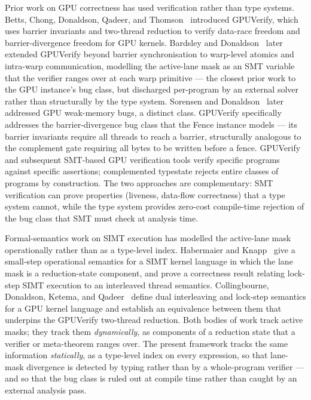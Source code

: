 \documentclass[acmsmall,screen,review,anonymous,nonacm]{acmart}
\begin{document}
Prior work on GPU correctness has used verification rather than type systems. Betts, Chong, Donaldson, Qadeer, and Thomson~\cite{betts:oopsla:2012} introduced GPUVerify, which uses barrier invariants and two-thread reduction to verify data-race freedom and barrier-divergence freedom for GPU kernels. Bardsley and Donaldson~\cite{bardsley:nfm:2014} later extended GPUVerify beyond barrier synchronisation to warp-level atomics and intra-warp communication, modelling the active-lane mask as an SMT variable that the verifier ranges over at each warp primitive --- the closest prior work to the GPU instance's bug class, but discharged per-program by an external solver rather than structurally by the type system. Sorensen and Donaldson~\cite{sorensen:pldi:2016} later addressed GPU weak-memory bugs, a distinct class. GPUVerify specifically addresses the barrier-divergence bug class that the Fence instance models --- its barrier invariants require all threads to reach a barrier, structurally analogous to the complement gate requiring all bytes to be written before a fence. GPUVerify and subsequent SMT-based GPU verification tools verify specific programs against specific assertions; complemented typestate rejects entire classes of programs by construction. The two approaches are complementary: SMT verification can prove properties (liveness, data-flow correctness) that a type system cannot, while the type system provides zero-cost compile-time rejection of the bug class that SMT must check at analysis time.

Formal-semantics work on SIMT execution has modelled the active-lane mask operationally rather than as a type-level index. Habermaier and Knapp~\cite{habermaier:esop:2012} give a small-step operational semantics for a SIMT kernel language in which the lane mask is a reduction-state component, and prove a correctness result relating lock-step SIMT execution to an interleaved thread semantics. Collingbourne, Donaldson, Ketema, and Qadeer~\cite{collingbourne:esop:2013} define dual interleaving and lock-step semantics for a GPU kernel language and establish an equivalence between them that underpins the GPUVerify two-thread reduction. Both bodies of work track active masks; they track them \emph{dynamically}, as components of a reduction state that a verifier or meta-theorem ranges over. The present framework tracks the same information \emph{statically}, as a type-level index on every expression, so that lane-mask divergence is detected by typing rather than by a whole-program verifier --- and so that the bug class is ruled out at compile time rather than caught by an external analysis pass.
\end{document}
